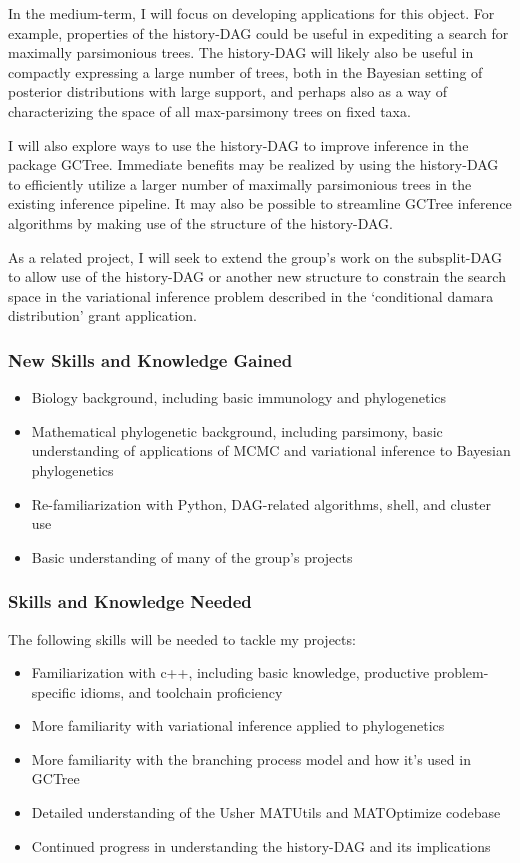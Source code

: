 \documentclass{paper}
\begin{document}
In the medium-term, I will focus on developing applications for this object.
For example, properties of the history-DAG could be useful in expediting a search for maximally parsimonious trees.
The history-DAG will likely also be useful in compactly expressing a large number of trees, both in the Bayesian setting of posterior distributions with large support, and perhaps also as a way of characterizing the space of all max-parsimony trees on fixed taxa.

I will also explore ways to use the history-DAG to improve inference in the package GCTree.
Immediate benefits may be realized by using the history-DAG to efficiently utilize a larger number of maximally parsimonious trees in the existing inference pipeline.
It may also be possible to streamline GCTree inference algorithms by making use of the structure of the history-DAG.

As a related project, I will seek to extend the group's work on the subsplit-DAG to allow use of the history-DAG or another new structure to constrain the search space in the variational inference problem described in the  `conditional damara distribution' grant application.

\subsubsection*{New Skills and Knowledge Gained}
\begin{itemize}
    \item Biology background, including basic immunology and phylogenetics
    \item Mathematical phylogenetic background, including parsimony, basic understanding of applications of MCMC and variational inference to Bayesian phylogenetics
    \item Re-familiarization with Python, DAG-related algorithms, shell, and cluster use
    \item Basic understanding of many of the group's projects
\end{itemize}
\subsubsection*{Skills and Knowledge Needed}
The following skills will be needed to tackle my projects:
\begin{itemize}
    \item Familiarization with c++, including basic knowledge, productive problem-specific idioms, and toolchain proficiency
    \item More familiarity with variational inference applied to phylogenetics
    \item More familiarity with the branching process model and how it's used in GCTree
    \item Detailed understanding of the Usher MATUtils and MATOptimize codebase
    \item Continued progress in understanding the history-DAG and its implications
\end{itemize}
\end{document}
